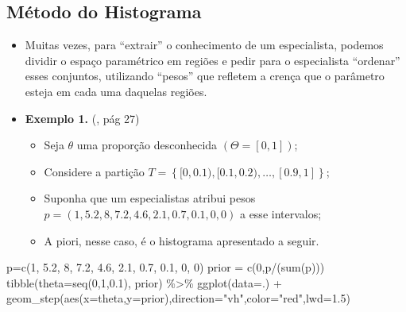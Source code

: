 \documentclass[
]{book}
\newenvironment{Shaded}{\begin{snugshade}}{\end{snugshade}}
\newcommand{\AttributeTok}[1]{\textcolor[rgb]{0.77,0.63,0.00}{#1}}
\newcommand{\DecValTok}[1]{\textcolor[rgb]{0.00,0.00,0.81}{#1}}
\newcommand{\FloatTok}[1]{\textcolor[rgb]{0.00,0.00,0.81}{#1}}
\newcommand{\FunctionTok}[1]{\textcolor[rgb]{0.00,0.00,0.00}{#1}}
\newcommand{\NormalTok}[1]{#1}
\newcommand{\OtherTok}[1]{\textcolor[rgb]{0.56,0.35,0.01}{#1}}
\newcommand{\SpecialCharTok}[1]{\textcolor[rgb]{0.00,0.00,0.00}{#1}}
\newcommand{\StringTok}[1]{\textcolor[rgb]{0.31,0.60,0.02}{#1}}
\providecommand{\tightlist}{%
  \setlength{\itemsep}{0pt}\setlength{\parskip}{0pt}}
\begin{document}
\hypertarget{muxe9todo-do-histograma}{%
\subsection{Método do Histograma}\label{muxe9todo-do-histograma}}

\begin{itemize}
\item
  Muitas vezes, para ``extrair'' o conhecimento de um especialista, podemos dividir o espaço paramétrico em regiões e pedir para o especialista ``ordenar'' esses conjuntos, utilizando ``pesos'' que refletem a crença que o parâmetro esteja em cada uma daquelas regiões.
\item
  \textbf{Exemplo 1.} (\citet{Albert09}, pág 27)

  \begin{itemize}
  \tightlist
  \item
    Seja \(\theta\) uma proporção desconhecida \((\Theta=[0,1])\);\\
  \item
    Considere a partição \(T = \left\{[0,0.1), [0.1,0.2), \ldots, [0.9,1] \right\}\);
  \item
    Suponha que um especialistas atribui pesos \(p=(1, 5.2, 8, 7.2, 4.6, 2.1, 0.7, 0.1, 0, 0)\) a esse intervalos;\\
  \item
    A piori, nesse caso, é o histograma apresentado a seguir.
  \end{itemize}
\end{itemize}

\begin{Shaded}
\begin{Highlighting}[]
\NormalTok{p}\OtherTok{=}\FunctionTok{c}\NormalTok{(}\DecValTok{1}\NormalTok{, }\FloatTok{5.2}\NormalTok{, }\DecValTok{8}\NormalTok{, }\FloatTok{7.2}\NormalTok{, }\FloatTok{4.6}\NormalTok{, }\FloatTok{2.1}\NormalTok{, }\FloatTok{0.7}\NormalTok{, }\FloatTok{0.1}\NormalTok{, }\DecValTok{0}\NormalTok{, }\DecValTok{0}\NormalTok{)}
\NormalTok{prior }\OtherTok{=} \FunctionTok{c}\NormalTok{(}\DecValTok{0}\NormalTok{,p}\SpecialCharTok{/}\NormalTok{(}\FunctionTok{sum}\NormalTok{(p)))}
\FunctionTok{tibble}\NormalTok{(}\AttributeTok{theta=}\FunctionTok{seq}\NormalTok{(}\DecValTok{0}\NormalTok{,}\DecValTok{1}\NormalTok{,}\FloatTok{0.1}\NormalTok{), prior) }\SpecialCharTok{\%\textgreater{}\%} 
  \FunctionTok{ggplot}\NormalTok{(}\AttributeTok{data=}\NormalTok{.) }\SpecialCharTok{+}
  \FunctionTok{geom\_step}\NormalTok{(}\FunctionTok{aes}\NormalTok{(}\AttributeTok{x=}\NormalTok{theta,}\AttributeTok{y=}\NormalTok{prior),}\AttributeTok{direction=}\StringTok{"vh"}\NormalTok{,}\AttributeTok{color=}\StringTok{"red"}\NormalTok{,}\AttributeTok{lwd=}\FloatTok{1.5}\NormalTok{)}
\end{Highlighting}
\end{Shaded}
\end{document}
